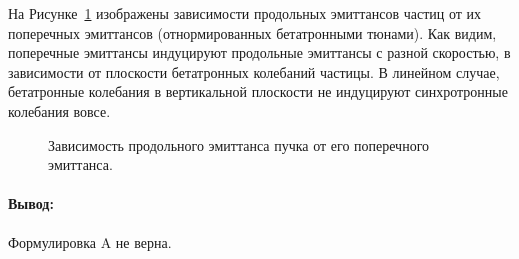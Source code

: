 На Рисунке~\ref{fig:long_emitt_vs_trans_emitt} изображены зависимости продольных эмиттансов частиц от их поперечных эмиттансов (отнормированных бетатронными тюнами). Как видим, поперечные эмиттансы индуцируют продольные эмиттансы с разной скоростью, в зависимости от плоскости бетатронных колебаний частицы. В линейном случае, бетатронные колебания в вертикальной плоскости не индуцируют синхротронные колебания вовсе.
\begin{figure}[h]
	\centering
	\caption{Зависимость продольного эмиттанса пучка от его поперечного эмиттанса.\label{fig:long_emitt_vs_trans_emitt}}
\end{figure}

\paragraph{Вывод:} Формулировка A не верна. 

